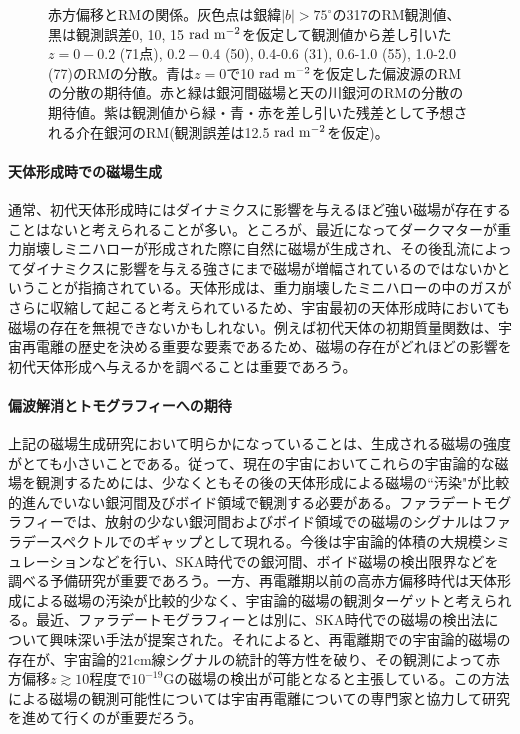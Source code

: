 \begin{figure}[tbp]
\begin{center}
\end{center}
\caption{赤方偏移とRMの関係。灰色点は銀緯$|b|> 75^\circ$の317のRM観測値\citep{1209.1438v2}、黒は観測誤差0, 10, 15 ${\rm rad~m^{-2}}$を仮定して観測値から差し引いた$z=0-0.2$ (71点), $0.2-0.4$ (50), 0.4-0.6 (31), 0.6-1.0 (55), 1.0-2.0 (77)のRMの分散。青は$z=0$で10 ${\rm rad~m^{-2}}$を仮定した偏波源のRMの分散の期待値。赤と緑は銀河間磁場\citep{2011ApJ...738..134A}と天の川銀河\citep{2010MNRAS.409L..99S}のRMの分散の期待値。紫は観測値から緑・青・赤を差し引いた残差として予想される介在銀河のRM(観測誤差は12.5 ${\rm rad~m^{-2}}$を仮定)。
}\label{c06.s3.ss11.f1}
\end{figure}

\paragraph{天体形成時での磁場生成}

通常、初代天体形成時にはダイナミクスに影響を与えるほど強い磁場が存在することはないと考えられることが多い。ところが、最近になってダークマターが重力崩壊しミニハローが形成された際に自然に磁場が生成され、その後乱流によってダイナミクスに影響を与える強さにまで磁場が増幅されているのではないかということが指摘されている\citep{2008ApJ...688L..57X,2010ApJ...721L.134S}。天体形成は、重力崩壊したミニハローの中のガスがさらに収縮して起こると考えられているため、宇宙最初の天体形成時においても磁場の存在を無視できないかもしれない。例えば初代天体の初期質量関数は、宇宙再電離の歴史を決める重要な要素であるため、磁場の存在がどれほどの影響を初代天体形成へ与えるかを調べることは重要であろう。

\paragraph{偏波解消とトモグラフィーへの期待}

上記の磁場生成研究において明らかになっていることは、生成される磁場の強度がとても小さいことである。従って、現在の宇宙においてこれらの宇宙論的な磁場を観測するためには、少なくともその後の天体形成による磁場の``汚染"が比較的進んでいない銀河間及びボイド領域で観測する必要がある。ファラデートモグラフィーでは、放射の少ない銀河間およびボイド領域での磁場のシグナルはファラデースペクトルでのギャップとして現れる。今後は宇宙論的体積の大規模シミュレーションなどを行い、SKA時代での銀河間、ボイド磁場の検出限界などを調べる予備研究が重要であろう。一方、再電離期以前の高赤方偏移時代は天体形成による磁場の汚染が比較的少なく、宇宙論的磁場の観測ターゲットと考えられる。最近、ファラデートモグラフィーとは別に、SKA時代での磁場の検出法について興味深い手法が提案された\citep{1410.2250}。それによると、再電離期での宇宙論的磁場の存在が、宇宙論的21cm線シグナルの統計的等方性を破り、その観測によって赤方偏移$z\gtrsim 10$程度で$10^{-19}$Gの磁場の検出が可能となると主張している。この方法による磁場の観測可能性については宇宙再電離についての専門家と協力して研究を進めて行くのが重要だろう。


